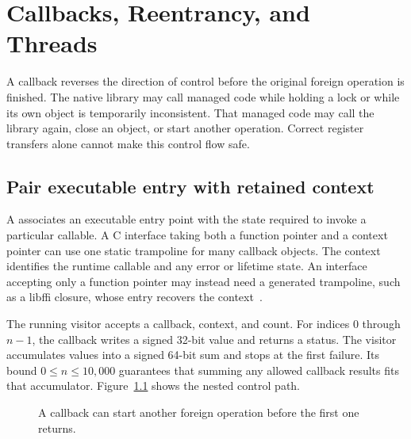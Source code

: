 \chapter{Callbacks, Reentrancy, and Threads}
\label{ch:ffi-callbacks}

A callback reverses the direction of control before the original foreign operation is finished.
The native library may call managed code while holding a lock or while its own object is temporarily inconsistent.
That managed code may call the library again, close an object, or start another operation.
Correct register transfers alone cannot make this control flow safe.

\section{Pair executable entry with retained context}
\label{sec:ch73-context}
A  associates an executable entry point with the state required to invoke a particular callable.
A C interface taking both a function pointer and a context pointer can use one static trampoline for many callback objects.
The context identifies the runtime callable and any error or lifetime state.
An interface accepting only a function pointer may instead need a generated trampoline, such as a libffi closure, whose entry recovers the context~\cite{libffi-2026-manual}.

The running visitor accepts a callback, context, and count.
For indices $0$ through $n-1$, the callback writes a signed 32-bit value and returns a status.
The visitor accumulates values into a signed 64-bit sum and stops at the first failure.
Its bound $0\le n\le10{,}000$ guarantees that summing any allowed callback results fits that accumulator.
Figure~\ref{fig:ch73-roundtrip} shows the nested control path.

\begin{figure}[htbp]
\centering
{}
\caption{A callback can start another foreign operation before the first one returns.}
\label{fig:ch73-roundtrip}
\end{figure}

